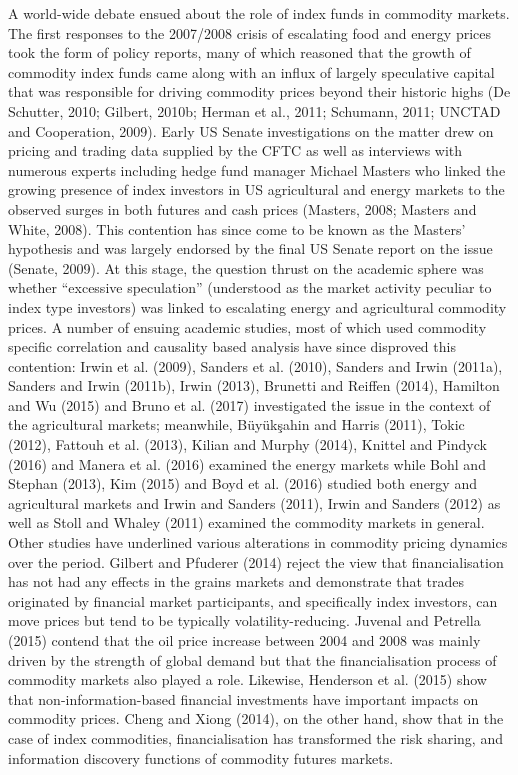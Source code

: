 \documentclass[]{elsarticle} %
\begin{document}
A world-wide debate ensued about the role of index funds in commodity markets. The first responses to the 2007/2008 crisis of escalating food and energy prices took the form of policy reports, many of which reasoned that the growth of commodity index funds came along with an influx of largely speculative capital that was responsible for driving commodity prices beyond their historic highs (De Schutter, 2010; Gilbert, 2010b; Herman et al., 2011; Schumann, 2011; UNCTAD and Cooperation, 2009). Early US Senate investigations on the matter drew on pricing and trading data supplied by the CFTC as well as interviews with numerous experts including hedge fund manager Michael Masters who linked the growing presence of index investors in US agricultural and energy markets to the observed surges in both futures and cash prices (Masters, 2008; Masters and White, 2008). This contention has since come to be known as the Masters' hypothesis and was largely endorsed by the final US Senate report on the issue (Senate, 2009). At this stage, the question thrust on the academic sphere was whether ``excessive speculation'' (understood as the market activity peculiar to index type investors) was linked to escalating energy and agricultural commodity prices. A number of ensuing academic studies, most of which used commodity specific correlation and causality based analysis have since disproved this contention: Irwin et al. (2009), Sanders et al. (2010), Sanders and Irwin (2011a), Sanders and Irwin (2011b), Irwin (2013), Brunetti and Reiffen (2014), Hamilton and Wu (2015) and Bruno et al. (2017) investigated the issue in the context of the agricultural markets; meanwhile, Büyükşahin and Harris (2011), Tokic (2012), Fattouh et al. (2013), Kilian and Murphy (2014), Knittel and Pindyck (2016) and Manera et al. (2016) examined the energy markets while Bohl and Stephan (2013), Kim (2015) and Boyd et al. (2016) studied both energy and agricultural markets and Irwin and Sanders (2011), Irwin and Sanders (2012) as well as Stoll and Whaley (2011) examined the commodity markets in general. Other studies have underlined various alterations in commodity pricing dynamics over the period. Gilbert and Pfuderer (2014) reject the view that financialisation has not had any effects in the grains markets and demonstrate that trades originated by financial market participants, and specifically index investors, can move prices but tend to be typically volatility-reducing. Juvenal and Petrella (2015) contend that the oil price increase between 2004 and 2008 was mainly driven by the strength of global demand but that the financialisation process of commodity markets also played a role. Likewise, Henderson et al. (2015) show that non-information-based financial investments have important impacts on commodity prices. Cheng and Xiong (2014), on the other hand, show that in the case of index commodities, financialisation has transformed the risk sharing, and information discovery functions of commodity futures markets.
\end{document}
